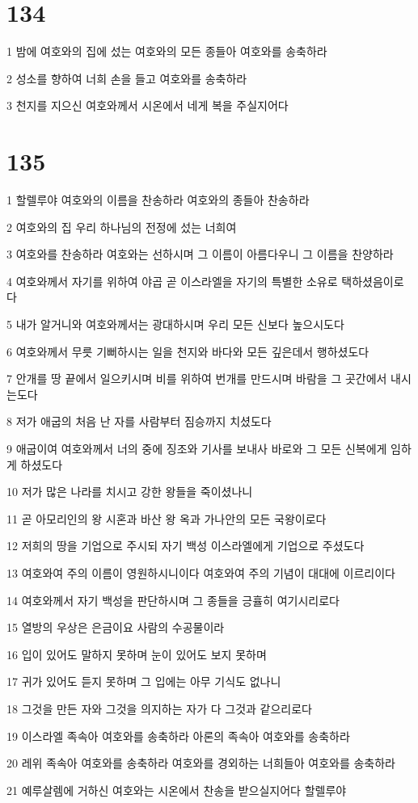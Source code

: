 \chapter{134}

\par 1 밤에 여호와의 집에 섰는 여호와의 모든 종들아 여호와를 송축하라
\par 2 성소를 향하여 너희 손을 들고 여호와를 송축하라
\par 3 천지를 지으신 여호와께서 시온에서 네게 복을 주실지어다

\chapter{135}

\par 1 할렐루야 여호와의 이름을 찬송하라 여호와의 종들아 찬송하라
\par 2 여호와의 집 우리 하나님의 전정에 섰는 너희여
\par 3 여호와를 찬송하라 여호와는 선하시며 그 이름이 아름다우니 그 이름을 찬양하라
\par 4 여호와께서 자기를 위하여 야곱 곧 이스라엘을 자기의 특별한 소유로 택하셨음이로다
\par 5 내가 알거니와 여호와께서는 광대하시며 우리 모든 신보다 높으시도다
\par 6 여호와께서 무릇 기뻐하시는 일을 천지와 바다와 모든 깊은데서 행하셨도다
\par 7 안개를 땅 끝에서 일으키시며 비를 위하여 번개를 만드시며 바람을 그 곳간에서 내시는도다
\par 8 저가 애굽의 처음 난 자를 사람부터 짐승까지 치셨도다
\par 9 애굽이여 여호와께서 너의 중에 징조와 기사를 보내사 바로와 그 모든 신복에게 임하게 하셨도다
\par 10 저가 많은 나라를 치시고 강한 왕들을 죽이셨나니
\par 11 곧 아모리인의 왕 시혼과 바산 왕 옥과 가나안의 모든 국왕이로다
\par 12 저희의 땅을 기업으로 주시되 자기 백성 이스라엘에게 기업으로 주셨도다
\par 13 여호와여 주의 이름이 영원하시니이다 여호와여 주의 기념이 대대에 이르리이다
\par 14 여호와께서 자기 백성을 판단하시며 그 종들을 긍휼히 여기시리로다
\par 15 열방의 우상은 은금이요 사람의 수공물이라
\par 16 입이 있어도 말하지 못하며 눈이 있어도 보지 못하며
\par 17 귀가 있어도 듣지 못하며 그 입에는 아무 기식도 없나니
\par 18 그것을 만든 자와 그것을 의지하는 자가 다 그것과 같으리로다
\par 19 이스라엘 족속아 여호와를 송축하라 아론의 족속아 여호와를 송축하라
\par 20 레위 족속아 여호와를 송축하라 여호와를 경외하는 너희들아 여호와를 송축하라
\par 21 예루살렘에 거하신 여호와는 시온에서 찬송을 받으실지어다 할렐루야

